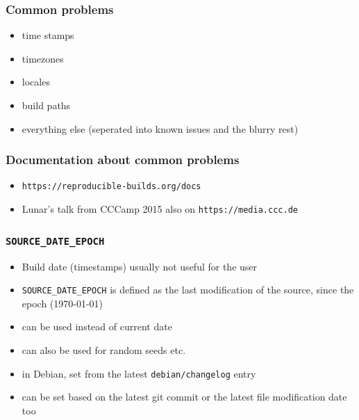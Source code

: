 \documentclass[14pt,aspectratio=169]{beamer}
\newif\ifplacelogo
\begin{document}
\placelogofalse

\begin{frame}
 \frametitle{Common problems}

 \begin{itemize}
  \item time stamps
  \item timezones
  \item locales
  \item build paths
  \item everything else (seperated into known issues and the blurry rest)
 \end{itemize}
\end{frame}

\begin{frame}
 \frametitle{Documentation about common problems}
 \begin{itemize}
  \item \texttt{https://reproducible-builds.org/docs}
  \item Lunar's talk from CCCamp 2015 also on
  \texttt{https://media.ccc.de}
 \end{itemize}
\end{frame}


\begin{frame}
 \frametitle{\texttt{SOURCE\_DATE\_EPOCH}}

 \begin{itemize}
  \item Build date (timestamps) usually not useful for the user
  \item \texttt{SOURCE\_DATE\_EPOCH} is defined as the last modification of
  the source, since the epoch (1970-01-01)
  \item can be used instead of current date
  \item can also be used for random seeds etc.
  \item in Debian, set from the latest \texttt{debian/changelog} entry
  \item can be set based on the latest git commit or the latest file
  modification date too
 \end{itemize}
\end{frame}
\end{document}
